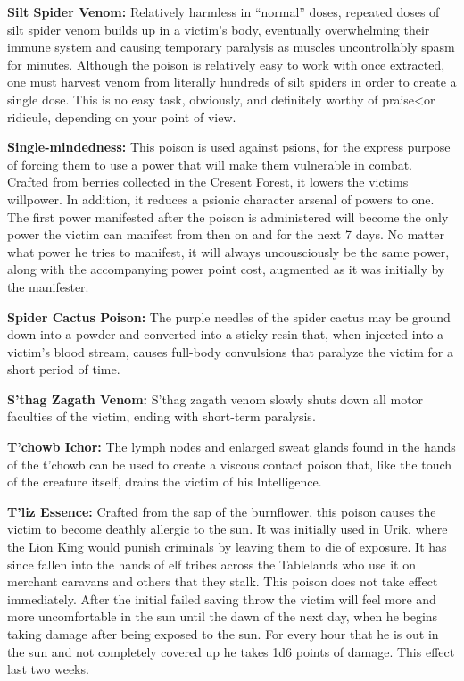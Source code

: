 \textbf{Silt Spider Venom:} Relatively harmless in ``normal'' doses, repeated doses of silt spider venom builds up in a victim's body, eventually overwhelming their immune system and causing temporary paralysis as muscles uncontrollably spasm for minutes. Although the poison is relatively easy to work with once extracted, one must harvest venom from literally hundreds of silt spiders in order to create a single dose. This is no easy task, obviously, and definitely worthy of praise<or ridicule, depending on your point of view.

\textbf{Single-mindedness:} This poison is used against psions, for the express purpose of forcing them to use a power that will make them vulnerable in combat. Crafted from berries collected in the Cresent Forest, it lowers the victims willpower. In addition, it reduces a psionic character arsenal of powers to one. The first power manifested after the poison is administered will become the only power the victim can manifest from then on and for the next 7 days. No matter what power he tries to manifest, it will always uncousciously be the same power, along with the accompanying power point cost, augmented as it was initially by the manifester.

\textbf{Spider Cactus Poison:} The purple needles of the spider cactus may be ground down into a powder and converted into a sticky resin that, when injected into a victim's blood stream, causes full-body convulsions that paralyze the victim for a short period of time.

\textbf{S'thag Zagath Venom:} S'thag zagath venom slowly shuts down all motor faculties of the victim, ending with short-term paralysis.

\textbf{T'chowb Ichor:} The lymph nodes and enlarged sweat glands found in the hands of the t'chowb can be used to create a viscous contact poison that, like the touch of the creature itself, drains the victim of his Intelligence.

\textbf{T'liz Essence:} Crafted from the sap of the burnflower, this poison causes the victim to become deathly allergic to the sun. It was initially used in Urik, where the Lion King would punish criminals by leaving them to die of exposure. It has since fallen into the hands of elf tribes across the Tablelands who use it on merchant caravans and others that they stalk. This poison does not take effect immediately. After the initial failed saving throw the victim will feel more and more uncomfortable in the sun until the dawn of the next day, when he begins taking damage after being exposed to the sun. For every hour that he is out in the sun and not completely covered up he takes 1d6 points of damage. This effect last two weeks.

